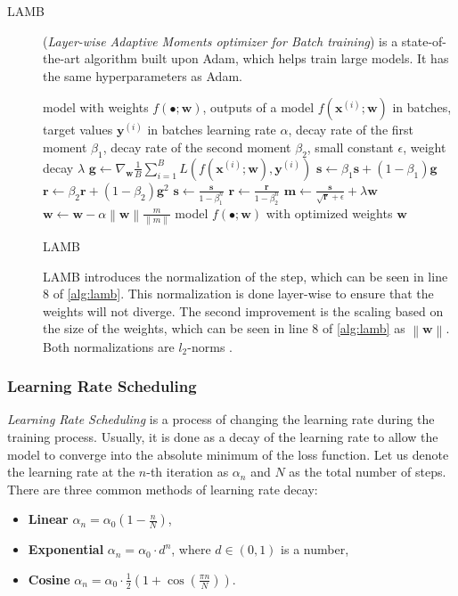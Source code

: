 \begin{description}
    \item[LAMB] (\emph{Layer-wise Adaptive Moments optimizer for Batch training}) \cite{lamb} is a state-of-the-art \dl algorithm built upon Adam, which helps train large models.
    It has the same hyperparameters as Adam.
    \begin{algorithm}
        \begin{algorithmic}[1]
        \Require model with weights $f(\bullet;\pmb{w})$, outputs of a model $f(\pmb{x}^{(i)};\pmb{w})$ in batches, target values $\pmb{y}^{(i)}$ in batches
        \Require learning rate $\alpha$, decay rate of the first moment $\beta_1$, decay rate of the second moment $\beta_2$, small constant $\epsilon$, weight decay $\lambda$
            \State $\pmb{g} \gets \nabla_{\pmb{w}} \frac1B \sum_{i=1}^B L(f(\pmb{x}^{(i)};\pmb{w}),\pmb{y}^{(i)})$
            \State $\pmb{s} \gets \beta_1 \pmb{s} + (1 - \beta_1) \pmb{g}$
            \State $\pmb{r} \gets \beta_2 \pmb{r} + (1 - \beta_2) \pmb{g}^2$
            \State $\pmb{s} \gets \frac{\pmb{s}}{1 - \beta_1^n}$
            \State $\pmb{r} \gets \frac{\pmb{r}}{1 - \beta_2^n}$
            \State $\pmb{m} \gets \frac{\pmb{s}}{\sqrt{\pmb{r}} + \epsilon} + \lambda \pmb{w}$
            \State $\pmb{w} \gets \pmb{w} - \alpha  \left\lVert \pmb{w} \right\rVert  \frac{m}{\left\lVert m \right\rVert}$
        \EndFor
        \Ensure model $f(\bullet;\pmb{w})$ with optimized weights $\pmb{w}$
        \end{algorithmic}
        \caption{LAMB}
        \label{alg:lamb}
    \end{algorithm}
    LAMB introduces the normalization of the step, which can be seen in line 8 of \cref{alg:lamb}.
    This normalization is done layer-wise to ensure that the weights will not diverge.
    The second improvement is the scaling based on the size of the weights, which can be seen in line 8 of \cref{alg:lamb} as $\left\lVert \pmb{w} \right\rVert$.
    Both normalizations are $l_2$-norms \cite{lamb}.
\end{description}

\subsubsection*{Learning Rate Scheduling}
\emph{Learning Rate Scheduling} is a process of changing the learning rate during the training process.
Usually, it is done as a decay of the learning rate to allow the model to converge into the absolute minimum of the loss function.
Let us denote the learning rate at the $n$-th iteration as $\alpha_n$ and $N$ as the total number of steps.
There are three common methods of learning rate decay: 
\begin{itemize}
    \item \textbf{Linear} $\alpha_n = \alpha_0\left(1-\frac{n}{N}\right)$,
    \item \textbf{Exponential} $\alpha_n = \alpha_0\cdot d^n$, where $d \in (0,1)$ is a number,
    \item \textbf{Cosine} $\alpha_n = \alpha_0\cdot\frac12\left(1+\cos\left(\frac{\pi n}{N}\right)\right)$.
\end{itemize}
